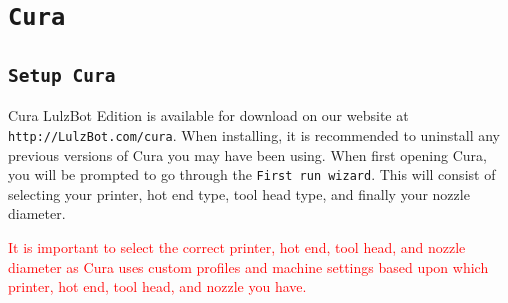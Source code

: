 %
%
%
%
%

\section{\texttt{Cura}}
\label{Cura}

\subsection{\texttt{Setup Cura}}
Cura LulzBot Edition is available for download on our website at \texttt{http://LulzBot.com/cura}. When installing, it is recommended to uninstall any previous versions of Cura you may have been using. 
When first opening Cura, you will be prompted to go through the \texttt{First run wizard}. This will consist of selecting your printer, hot end type, tool head type, and finally your nozzle diameter.

\textcolor{red}{It is important to select the correct printer, hot end, tool head, and nozzle diameter as Cura uses custom profiles and machine settings based upon which printer, hot end, tool head, and nozzle you have.}

